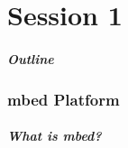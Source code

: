 \part{Session 1}

\begin{frame}[t]
	\frametitle{Outline}
	\tableofcontents[part=2,pausesections]
\end{frame}

\section{mbed Platform}
\begin{frame}[t]
	\frametitle{What is mbed?}
\end{frame}
